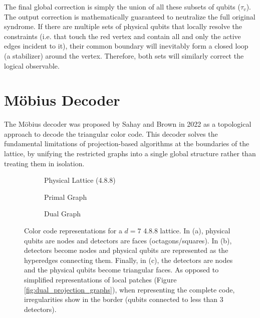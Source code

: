  The final global correction is simply the union of all these subsets of qubits ($\tau_v$). The output correction is mathematically guaranteed to neutralize the full original syndrome. If there are multiple sets of physical qubits that locally resolve the constraints (i.e. that touch the red vertex and contain all and only the active edges incident to it), their common boundary will inevitably form a closed loop (a stabilizer) around the vertex. Therefore, both sets will similarly correct the logical observable.

\section{Möbius Decoder}
\label{sec:mobius_decoder}

The Möbius decoder was proposed by Sahay and Brown in 2022 \cite{Sahay_2022} as a topological approach to decode the triangular color code. This decoder solves the fundamental limitations of projection-based algorithms at the boundaries of the lattice, by unifying the restricted graphs into a single global structure rather than treating them in isolation.

\begin{figure}[!hbpt]
    \centering
    \begin{subfigure}{0.32\textwidth}
        \centering
        \resizebox{\textwidth}{!}{%
            }
        \caption{Physical Lattice (4.8.8)}
    \end{subfigure}
    \hfill
    \begin{subfigure}{0.32\textwidth}
        \centering
        \resizebox{\textwidth}{!}{%
            }
        \caption{Primal Graph}
    \end{subfigure}
    \hfill
    \begin{subfigure}{0.32\textwidth}
        \centering
        \resizebox{\textwidth}{!}{%
            }
        \caption{Dual Graph}
    \end{subfigure}
    \caption[Color code representations for a $d=7$ 4.8.8 lattice]{Color code representations for a $d=7$ 4.8.8 lattice. In (a), physical qubits are nodes and detectors are faces (octagons/squares). In (b), detectors become nodes and physical qubits are represented as the hyperedges connecting them. Finally, in (c), the detectors are nodes and the physical qubits become triangular faces. As opposed to simplified representations of local patches (Figure \ref{fig:dual_projection_graphs}), when representing the complete code, irregularities show in the border (qubits connected to less than 3 detectors).}
    \label{fig:color_code_representations}
\end{figure}

